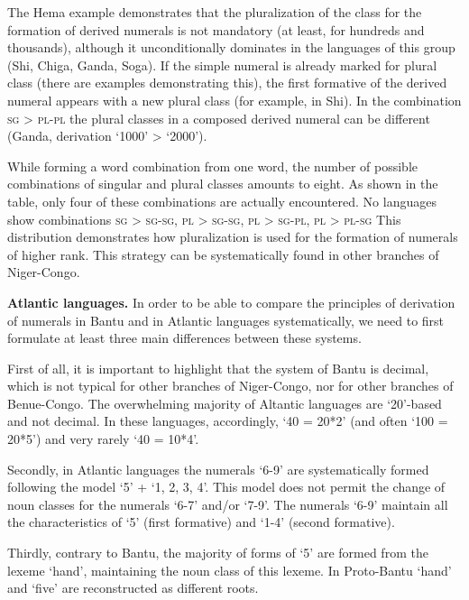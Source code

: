 The Hema example demonstrates that the pluralization of the class for the formation of derived numerals is not mandatory (at least, for hundreds and thousands), although it unconditionally dominates in the languages of this group (Shi, Chiga, Ganda, Soga). If the simple numeral is already marked for plural class (there are examples demonstrating this), the first formative of the derived numeral appears with a new plural class (for example, in Shi). In the combination \textsc{sg} > \textsc{pl}-\textsc{pl} the plural classes in a composed derived numeral can be different (Ganda, derivation ‘1000’ > ‘2000’). 

While forming a word combination from one word, the number of possible combinations of singular and plural classes amounts to eight. As shown in the table, only four of these combinations are actually encountered. No languages show combinations \textsc{sg} > \textsc{sg}-\textsc{sg}, \textsc{pl} > \textsc{sg}-\textsc{sg}, \textsc{pl} > \textsc{sg}-\textsc{pl}, \textsc{pl} > \textsc{pl}-\textsc{sg} This distribution demonstrates how pluralization is used for the formation of numerals of higher rank. This strategy can be systematically found in other branches of Niger-Congo. 

\textbf{Atlantic languages.} In order to be able to compare the principles of derivation of numerals in Bantu and in Atlantic languages systematically, we need to first formulate at least three main differences between these systems.  

First of all, it is important to highlight that the system of Bantu is decimal, which is not typical for other branches of Niger-Congo, nor for other branches of Benue-Congo. The overwhelming majority of Altantic languages are ‘20’-based and not decimal. In these languages, accordingly, ‘40 = 20*2’ (and often ‘100 = 20*5’) and very rarely ‘40 = 10*4’.

Secondly, in Atlantic languages the numerals ‘6-9’ are systematically formed following the model ‘5’ + ‘1, 2, 3, 4’. This model does not permit the change of noun classes for the numerals ‘6-7’ and/or ‘7-9’. The numerals ‘6-9’ maintain all the characteristics of `5' (first formative) and ‘1-4’ (second formative). 

Thirdly, contrary to Bantu, the majority of forms of ‘5’ are formed from the lexeme ‘hand’, maintaining the noun class of this lexeme. In Proto-Bantu ‘hand’ and ‘five’ are reconstructed as different roots. 

